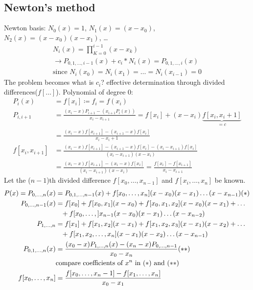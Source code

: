 \subsection{Newton's method}\label{subsec:newton's-method}
Newton basis: $N_0 (x) = 1$, $N_1(x) =(x-x_0)$, $N_2(x)=(x-x_0)(x-x_1)$, \ldots
\begin{align*}
    N_i(x)=\prod_{K=0}^{i-1}(x-x_k)\\
    \to P_{0,1,\ldots, i-1}(x)+c_i * N_i(x) = P_{0,1,\ldots, i}(x)\\
    \text{since } N_i(x_0)=N_i(x_1)=\ldots=N_i(x_{i-1})=0
\end{align*}
The problem becomes what is $c_i$?
effective determination through divided differences($f[\ldots]$). Polynomial of degree 0:
\begin{align*}
    P_i(x) &= f[x_i] \coloneqq f_i = f(x_i)\\
    P_{i, i+1} &= \frac{(x_i - x) P_{i+1}-(x_{i+1} P_i(x))}{x_i-x_{i+1}} =f[x_i]+(x-x_i)\underbrace{f[x_i, x_i+1]}_{=c}\\
    &=\frac{(x_i-x)f[x_{i+1}]-(x_{i+1}-x) f[x_i]}{x_i-x_i+1}\\
    f[x_i, x_{i+1}] &= \frac{(x_i-x)f[x_{i+1}]-(x_{i+1}-x) f[x_i]-(x_i-x_{i+1}) f[x_i]}{(x_i-x_{i+1})(x-x_i)}\\
    &= \frac{(x_i-x)f[x_{i+1}]-(x_i-x)f[x_i]}{(x_i-x_{i+1})(x-x_i)}=\frac{f[x_i]-f[x_{i+1}]}{x_i-x_{i+1}}
\end{align*}
Let the ($n-1$)th divided difference $f[x_0, \ldots, x_{n-1}]$ and $f[x_i, \ldots, x_n]$ be known.
\begin{align*}
    P(x)=P_{0, \ldots, n}(x)&=P_{0,1,\ldots, n-1}(x)+f[x_0, \ldots, x_n](x-x_0)(x-x_1)\ldots(x-x_{n-1}) \text{(\textasteriskcentered{})}\\
    P_{0,\ldots, n-1}(x)&=f[x_0]+f[x_0, x_1](x-x_0)+f[x_0,x_1,x_2](x-x_0)(x-x_1)+
    \ldots\\
    &\phantom{=}+f[x_0,\ldots, ]x_{n-1}(x-x_0)(x-x_1)\ldots(x-x_{n-2})\\
    P_{1,\ldots, n} &= f[x_1] + f[x_1, x_2](x-x_1)+f[x_1, x_2, x_3](x-x_1)(x-x_2)+\ldots\\
    &\phantom{=}+f[x_1, x_2, \ldots, x_n] (x-x_1)(x-x_2)\ldots (x-x_{n-1})\\
    P_{0,1,\ldots, n}(x) &= \frac{(x_0-x)P_{1,\ldots, n}(x)-(x_n-x)P_{0,\ldots, n-1}}{x_0-x_n} \text{(\textasteriskcentered{}\textasteriskcentered{})}\\
    &\text{compare coefficients of $x^n$ in (\textasteriskcentered{}) and (\textasteriskcentered{}\textasteriskcentered{})}\\
    f[x_0,\ldots, x_n]&=\frac{f[x_0, \ldots, x_n-1]-f[x_1, \ldots, x_n]}{x_0-x_1}
\end{align*}
